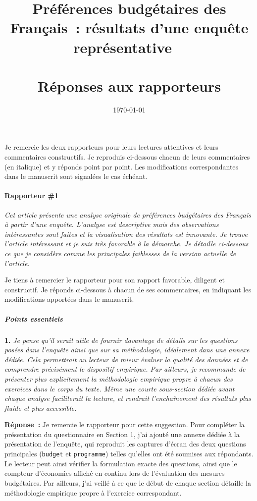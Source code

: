 \documentclass[12pt,french]{article}
\title{Préférences budgétaires des Français~: résultats d'une enquête représentative ~\\ ~\\ \textbf{Réponses aux rapporteurs}}
\date{\today}
\newcommand{\reponse}[1]{\medskip\par\noindent\textbf{Réponse~:} #1\par\medskip}
\begin{document}
\maketitle

\noindent Je remercie les deux rapporteurs pour leurs lectures attentives et leurs commentaires constructifs. Je reproduis ci-dessous chacun de leurs commentaires (en italique) et y réponds point par point. Les modifications correspondantes dans le manuscrit sont signalées le cas échéant.

\bigskip

\paragraph*{Rapporteur \#1}

\textit{Cet article présente une analyse originale de préférences budgétaires des Français à partir d'une enquête. L'analyse est descriptive mais des observations intéressantes sont faites et la visualisation des résultats est innovante. Je trouve l'article intéressant et je suis très favorable à la démarche. Je détaille ci-dessous ce que je considère comme les principales faiblesses de la version actuelle de l'article.}

Je tiens à remercier le rapporteur pour son rapport favorable, diligent et constructif. Je réponds ci-dessous à chacun de ses commentaires, en indiquant les modifications apportées dans le manuscrit.

\subparagraph*{Points essentiels}

\bigskip
\noindent\textbf{1.} \textit{Je pense qu'il serait utile de fournir davantage de détails sur les questions posées dans l'enquête ainsi que sur sa méthodologie, idéalement dans une annexe dédiée. Cela permettrait au lecteur de mieux évaluer la qualité des données et de comprendre précisément le dispositif empirique. Par ailleurs, je recommande de présenter plus explicitement la méthodologie empirique propre à chacun des exercices dans le corps du texte. Même une courte sous-section dédiée avant chaque analyse faciliterait la lecture, et rendrait l'enchaînement des résultats plus fluide et plus accessible.}

\reponse{Je remercie le rapporteur pour cette suggestion. Pour compléter la présentation du questionnaire en Section 1, j'ai ajouté une annexe dédiée à la présentation de l'enquête, qui reproduit les captures d'écran des deux questions principales (\texttt{budget} et \texttt{programme}) telles qu'elles ont été soumises aux répondants. Le lecteur peut ainsi vérifier la formulation exacte des questions, ainsi que le compteur d'économies affiché en continu lors de l'évaluation des mesures budgétaires. Par ailleurs, j'ai veillé à ce que le début de chaque section détaille la méthodologie empirique propre à l'exercice correspondant.}
\end{document}

